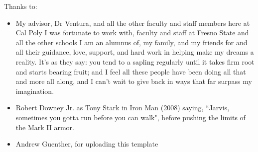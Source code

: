 \noindent
Thanks to:
\begin{itemize}
    \item My advisor, Dr Ventura, and all the other faculty and staff members here at Cal Poly I was fortunate to work with, faculty and staff at Fresno State and all the other schools I am an alumnus of, my family, and my friends for and all their guidance, love, support, and hard work in helping make my dreams a reality. It's as they say: you tend to a sapling regularly until it takes firm root and starts bearing fruit; and I feel all these people have been doing all that and more all along, and I can't wait to give back in ways that far surpass my imagination.
    \item Robert Downey Jr. as Tony Stark in Iron Man (2008) saying, ``Jarvis, sometimes you gotta run before you can walk", before pushing the limits of the Mark II armor.
    \item Andrew Guenther, for uploading this template
\end{itemize}
